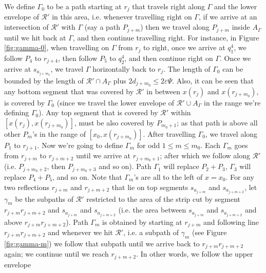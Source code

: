 \documentclass[pdflatex,sn-mathphys-num]{sn-jnl}
\theoremstyle{thmstyleone}
\newcommand{\eps}{\varepsilon}
\begin{document}
        We define $\Gamma_0$ to be a path starting at $r_j$ that travels right along $\Gamma$ and the lower envelope of $\mathcal R'$ in this area, i.e. whenever travelling right on $\Gamma$, if we arrive at an intersection of $\mathcal R'$ with $\Gamma$ (say a path $P_{j+m}$) then we travel along $P_{j+m}$ inside $A_{\Gamma}$ until we hit back at $\Gamma$, and then continue travelling right. For instance, in
        Figure \ref{fig:gamma-0}, when travelling on $\Gamma$ from $r_j$ to right, once we arrive at $q^4_1$, we follow $P_4$ to $r_{j+4}$, then follow $P_5$ to $q^4_2$, and then continue right on $\Gamma$. Once we arrive at $s_{a_{j+m_0}}$, we travel $\Gamma$ horizontally back to $r_{j}$. The length of $\Gamma_0$ can be bounded by the length of $\mathcal R'\cap A_{\Gamma}$ plus $2d_{j+m_0}\leq 2\eps\Psi$.
        Also, it can be seen that any bottom segment that was covered by $\mathcal R'$ in between $x(r_j)$ and $x(r_{j+m_0})$, is covered by $\Gamma_0$ (since we travel the lower envelope of $\mathcal R'\cup A_\Gamma$ in the range we're defining $ \Gamma_0 $). Any top segment that is covered by $\mathcal R'$ within $[x(r_j),x(r_{j+m_0})]$, must be also covered by $P_{m_0+1}$; as that path is above all other $P_m$'s in the range of $[x_0, x(r_{j+m_0})]$.   After travelling $\Gamma_0$, we travel along $P_1$ to $r_{j+1}$.
        Now we're going to define $\Gamma_m$ for odd $ 1\le m \le m_0 $. Each $\Gamma_m$ goes from $r_{j + m}$ to $r_{j + m + 2}$ 
        until we arrive at $r_{j+m_0+1}$; after which we follow along $\mathcal R'$ (i.e. $P_{j+m_0+2}$, then $P_{j+m_0+3}$ and so on). Path $\Gamma_1$ will replace $P_2+P_3$, $\Gamma_3$ will replace
        $P_4+P_5$, and so on. Note that $\Gamma_m$'s are all to the left of $x = x_0$.
	   For any two reflections $r_{j + m}$ and $r_{j + m + 2}$ that lie on top segments $s_{a_{j+m}}$ and $s_{a_{j+m + 2}}$, let $\gamma_m$ be the subpaths of $\mathcal R'$ restricted to the area of the strip cut by segment $r_{j + m}r_{j + m + 2}$ and $s_{a_{j+m}}$ and $s_{a_{j+m + 2}}$ (i.e. the area between $s_{a_{j+m}}$ and $s_{a_{j+m + 2}}$ and above $r_{j+m}r_{j + m + 2}$). Path $\Gamma_m$ is obtained by starting at $r_{j+m}$ and following line $r_{j + m}r_{j + m + 2}$ and whenever we hit $\mathcal R'$, i.e. a subpath of $\gamma_m$ (see Figure \ref{fig:gamma-m}) we follow that subpath until we arrive back to $r_{j+m}r_{j+m+2}$ again; we continue until we reach $r_{j+m+2}$. In other words, we follow the upper envelope
\end{document}
